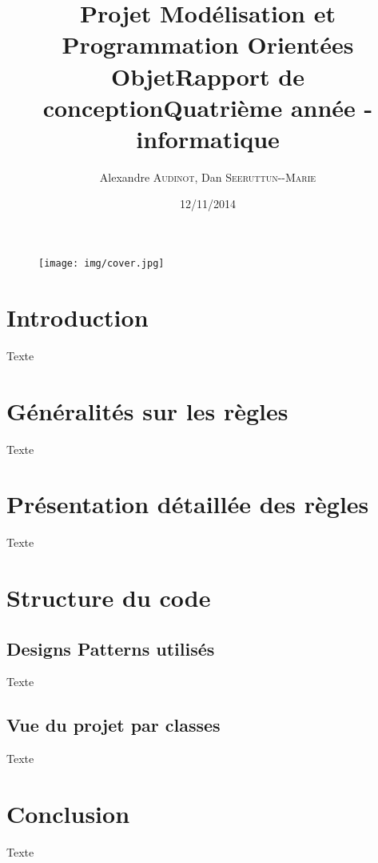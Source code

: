 \documentclass[12pt]{article}
\title{Projet Modélisation et Programmation Orientées Objet\smallbreak Rapport de conception\smallbreak Quatrième année - informatique }
\author{Alexandre \textsc{Audinot},  Dan \textsc{Seeruttun-{}-Marie}}
\date{12/11/2014}
\begin{document}
\maketitle

\begin{figure}[!h] 
\centerline{\texttt{[image: img/cover.jpg]}}
\end{figure}
\newpage

%


\newpage
\tableofcontents
\newpage


\section{Introduction}
Texte
\newpage
\section{Généralités sur les règles}
Texte
\newpage
\section{Présentation détaillée des règles}
Texte
\section{Structure du code}
\subsection{Designs Patterns utilisés}
Texte
\subsection{Vue du projet par classes}
Texte
\newpage
\section{Conclusion}
Texte
\end{document}
